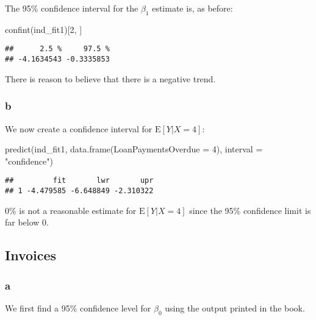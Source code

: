 \documentclass[
]{article}
\newenvironment{Shaded}{\begin{snugshade}}{\end{snugshade}}
\newcommand{\AttributeTok}[1]{\textcolor[rgb]{0.77,0.63,0.00}{#1}}
\newcommand{\DecValTok}[1]{\textcolor[rgb]{0.00,0.00,0.81}{#1}}
\newcommand{\FunctionTok}[1]{\textcolor[rgb]{0.00,0.00,0.00}{#1}}
\newcommand{\NormalTok}[1]{#1}
\newcommand{\StringTok}[1]{\textcolor[rgb]{0.31,0.60,0.02}{#1}}
\begin{document}
The 95\% confidence interval for the \(\beta_1\) estimate is, as before:

\begin{Shaded}
\begin{Highlighting}[]
\FunctionTok{confint}\NormalTok{(ind\_fit1)[}\DecValTok{2}\NormalTok{, ]}
\end{Highlighting}
\end{Shaded}

\begin{verbatim}
##      2.5 %     97.5 % 
## -4.1634543 -0.3335853
\end{verbatim}

There is reason to believe that there is a negative trend.

\hypertarget{b-1}{%
\subsubsection*{b}\label{b-1}}

We now create a confidence interval for \(\text{E}[Y|X=4]\):

\begin{Shaded}
\begin{Highlighting}[]
\FunctionTok{predict}\NormalTok{(ind\_fit1, }\FunctionTok{data.frame}\NormalTok{(}\AttributeTok{LoanPaymentsOverdue =} \DecValTok{4}\NormalTok{), }\AttributeTok{interval =} \StringTok{"confidence"}\NormalTok{)}
\end{Highlighting}
\end{Shaded}

\begin{verbatim}
##         fit       lwr       upr
## 1 -4.479585 -6.648849 -2.310322
\end{verbatim}

0\% is not a reasonable estimate for \(\text{E}[Y|X=4]\) since the 95\%
confidence limit is far below 0.

\hypertarget{invoices}{%
\subsection{Invoices}\label{invoices}}

\hypertarget{a-2}{%
\subsubsection*{a}\label{a-2}}

We first find a 95\% confidence level for \(\beta_0\) using the output
printed in the book.
\end{document}
